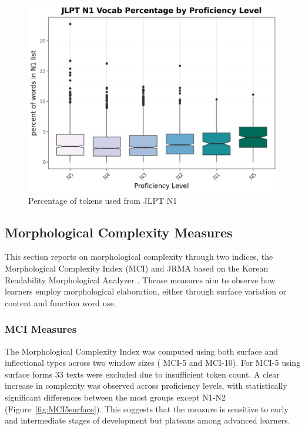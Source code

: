 \begin{figure}
           \centering
           \includegraphics[scale=.5]{img/LFP/JLPT_N1}
           \caption{Percentage of tokens used from JLPT N1}
           \label{fig:JLPTN1vocab}
\end{figure}


\subsection{Morphological Complexity Measures}
This section reports on morphological complexity through two indices, the Morphological Complexity Index (MCI)
\citep{Brezina2019} and JRMA based on the Korean Readability Morphological Analyzer \citep{Hwang2024}. Thease
measures aim to observe how learners employ morphological elaboration, either through surface variation or content
and function word use.

\subsubsection{MCI Measures}


The Morphological Complexity Index was computed using both surface and inflectional types across two window sizes (
MCI-5 and MCI-10). For MCI-5 using surface forms 33 texts were excluded due to insufficient token count. A clear
increase in complexity was observed across proficiency levels, with statistically significant differences between
the most groups except N1-N2 (Figure~\ref{fig:MCI5surface}). This suggests that the measure is sensitive to early and
intermediate stages of
development
but plateaus among advanced learners.



